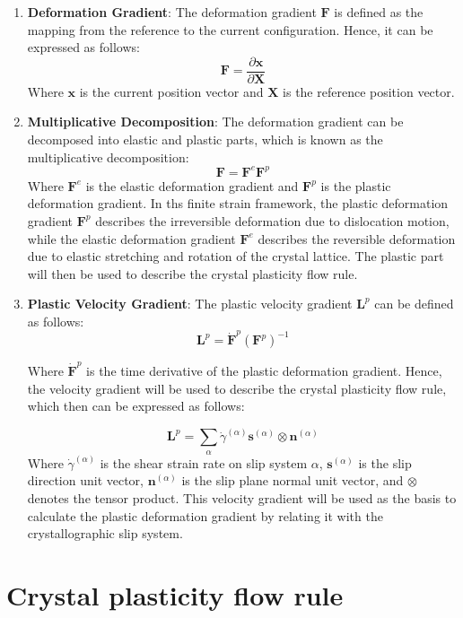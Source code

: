 \documentclass[12pt]{article}
\begin{document}
\begin{enumerate}
    \item \textbf{Deformation Gradient}: The deformation gradient $\boldsymbol{F}$ is defined as the mapping
    from the reference to the current configuration. Hence, it can be expressed as follows:
    \begin{equation}
        \boldsymbol{F} = \frac{\partial \boldsymbol{x}}{\partial \boldsymbol{X}}
    \end{equation}
    Where $\boldsymbol{x}$ is the current position vector and $\boldsymbol{X}$ is the reference position vector.
    \item \textbf{Multiplicative Decomposition}: The deformation gradient can be decomposed into elastic and 
    plastic parts, which is known as the multiplicative decomposition:
    \begin{equation}
        \boldsymbol{F} = \boldsymbol{F}^{e} \boldsymbol{F}^{p}
    \end{equation}
    Where $\boldsymbol{F}^{e}$ is the elastic deformation gradient and $\boldsymbol{F}^{p}$ is the plastic 
    deformation gradient. In ths finite strain framework, the plastic deformation gradient
    $\boldsymbol{F}^{p}$ describes the irreversible deformation due to dislocation motion, while the elastic
    deformation gradient $\boldsymbol{F}^{e}$ describes the reversible deformation due to elastic stretching
    and rotation of the crystal lattice. The plastic part will then be used to describe the crystal plasticity
    flow rule. 

    \item \textbf{Plastic Velocity Gradient}: The plastic velocity gradient $\boldsymbol{L}^{p}$ can be 
    defined as follows:
    \begin{equation}
        \boldsymbol{L}^{p} = \dot{\boldsymbol{F}}^{p} (\boldsymbol{F}^{p})^{-1}
    \end{equation}

    Where $\dot{\boldsymbol{F}}^{p}$ is the time derivative of the plastic deformation gradient. Hence, the velocity
    gradient will be used to describe the crystal plasticity flow rule, which then can be expressed as follows:
    
    \begin{equation}
        \boldsymbol{L}^{p} = \sum_{\alpha} \dot{\gamma}^{(\alpha)} \boldsymbol{s}^{(\alpha)} \otimes \boldsymbol{n}^{(\alpha)} 
\end{equation}
    Where $\dot{\gamma}^{(\alpha)}$ is the shear strain rate on slip system $\alpha$, $\boldsymbol{s}^{(\alpha)}$ is the slip direction unit vector,
    $\boldsymbol{n}^{(\alpha)}$ is the slip plane normal unit vector, and $\otimes$ denotes the tensor product. This velocity gradient 
    will be used as the basis to calculate the plastic deformation gradient by relating it with the crystallographic slip system. 
\end{enumerate}

\section{Crystal plasticity flow rule}
 



\end{document}
